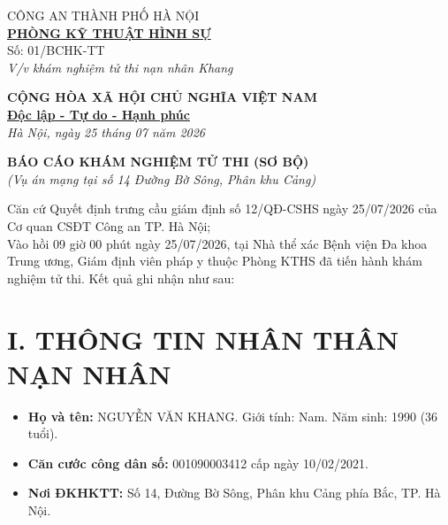 \documentclass[12pt,a4paper]{article}
\begin{document}
\noindent
\begin{minipage}[t]{0.45\textwidth}
    \begin{center}
        \small
        CÔNG AN THÀNH PHỐ HÀ NỘI\\
        \textbf{\underline{PHÒNG KỸ THUẬT HÌNH SỰ}}\\[0.1cm]
        Số: 01/BCHK-TT\\
        \textit{V/v khám nghiệm tử thi nạn nhân Khang}
    \end{center}
\end{minipage}
\hfill
\begin{minipage}[t]{0.52\textwidth}
    \begin{center}
        \small
        \textbf{CỘNG HÒA XÃ HỘI CHỦ NGHĨA VIỆT NAM}\\
        \textbf{\underline{Độc lập - Tự do - Hạnh phúc}}\\[0.1cm]
        \textit{Hà Nội, ngày 25 tháng 07 năm 2026}
    \end{center}
\end{minipage}

\vspace{0.6cm}

\begin{center}
    \textbf{\large BÁO CÁO KHÁM NGHIỆM TỬ THI (SƠ BỘ)}\\
    \textit{(Vụ án mạng tại số 14 Đường Bờ Sông, Phân khu Cảng)}
\end{center}

\vspace{0.3cm}

\noindent Căn cứ Quyết định trưng cầu giám định số 12/QĐ-CSHS ngày 25/07/2026 của Cơ quan CSĐT Công an TP. Hà Nội;\\
Vào hồi 09 giờ 00 phút ngày 25/07/2026, tại Nhà thể xác Bệnh viện Đa khoa Trung ương, Giám định viên pháp y thuộc Phòng KTHS đã tiến hành khám nghiệm tử thi. Kết quả ghi nhận như sau:

\section*{I. THÔNG TIN NHÂN THÂN NẠN NHÂN}
\begin{itemize}[leftmargin=1.5cm]
    \item \textbf{Họ và tên:} NGUYỄN VĂN KHANG. Giới tính: Nam. Năm sinh: 1990 (36 tuổi).
    \item \textbf{Căn cước công dân số:} 001090003412 cấp ngày 10/02/2021.
    \item \textbf{Nơi ĐKHKTT:} Số 14, Đường Bờ Sông, Phân khu Cảng phía Bắc, TP. Hà Nội.
\end{itemize}
\end{document}
